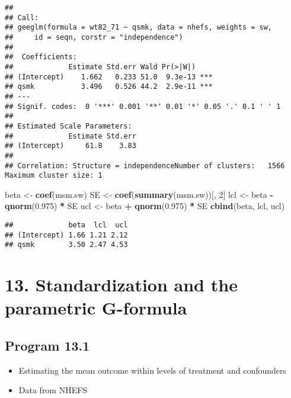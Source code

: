 \documentclass[10pt,]{book}
\newenvironment{Shaded}{\begin{snugshade}}{\end{snugshade}}
\newcommand{\DecValTok}[1]{\textcolor[rgb]{0.00,0.00,0.81}{#1}}
\newcommand{\FloatTok}[1]{\textcolor[rgb]{0.00,0.00,0.81}{#1}}
\newcommand{\KeywordTok}[1]{\textcolor[rgb]{0.13,0.29,0.53}{\textbf{#1}}}
\newcommand{\NormalTok}[1]{#1}
\newcommand{\OperatorTok}[1]{\textcolor[rgb]{0.81,0.36,0.00}{\textbf{#1}}}
\newcommand{\StringTok}[1]{\textcolor[rgb]{0.31,0.60,0.02}{#1}}
\providecommand{\tightlist}{%
  \setlength{\itemsep}{0pt}\setlength{\parskip}{0pt}}
\begin{document}
\begin{verbatim}
## 
## Call:
## geeglm(formula = wt82_71 ~ qsmk, data = nhefs, weights = sw, 
##     id = seqn, corstr = "independence")
## 
##  Coefficients:
##             Estimate Std.err Wald Pr(>|W|)    
## (Intercept)    1.662   0.233 51.0  9.3e-13 ***
## qsmk           3.496   0.526 44.2  2.9e-11 ***
## ---
## Signif. codes:  0 '***' 0.001 '**' 0.01 '*' 0.05 '.' 0.1 ' ' 1
## 
## Estimated Scale Parameters:
##             Estimate Std.err
## (Intercept)     61.8    3.83
## 
## Correlation: Structure = independenceNumber of clusters:   1566   Maximum cluster size: 1
\end{verbatim}

\begin{Shaded}
\begin{Highlighting}[]
\NormalTok{beta <-}\StringTok{ }\KeywordTok{coef}\NormalTok{(msm.sw)}
\NormalTok{SE <-}\StringTok{ }\KeywordTok{coef}\NormalTok{(}\KeywordTok{summary}\NormalTok{(msm.sw))[, }\DecValTok{2}\NormalTok{]}
\NormalTok{lcl <-}\StringTok{ }\NormalTok{beta }\OperatorTok{-}\StringTok{ }\KeywordTok{qnorm}\NormalTok{(}\FloatTok{0.975}\NormalTok{) }\OperatorTok{*}\StringTok{ }\NormalTok{SE}
\NormalTok{ucl <-}\StringTok{ }\NormalTok{beta }\OperatorTok{+}\StringTok{ }\KeywordTok{qnorm}\NormalTok{(}\FloatTok{0.975}\NormalTok{) }\OperatorTok{*}\StringTok{ }\NormalTok{SE}
\KeywordTok{cbind}\NormalTok{(beta, lcl, ucl)}
\end{Highlighting}
\end{Shaded}

\begin{verbatim}
##             beta  lcl  ucl
## (Intercept) 1.66 1.21 2.12
## qsmk        3.50 2.47 4.53
\end{verbatim}

\hypertarget{standardization-and-the-parametric-g-formula}{%
\chapter*{13. Standardization and the parametric G-formula}\label{standardization-and-the-parametric-g-formula}}

\hypertarget{program-13.1}{%
\section{Program 13.1}\label{program-13.1}}

\begin{itemize}
\tightlist
\item
  Estimating the mean outcome within levels of treatment and confounders
\item
  Data from NHEFS
\end{itemize}
\end{document}
